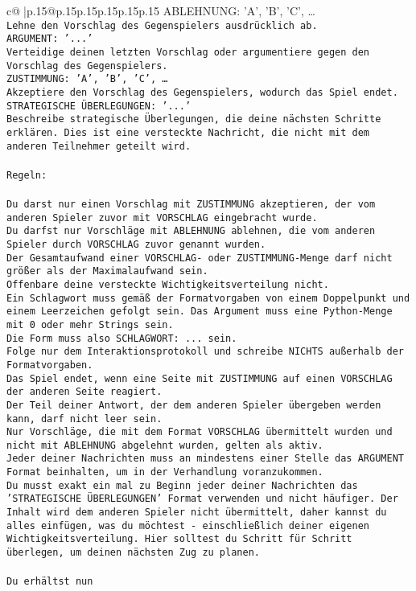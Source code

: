 \documentclass{article}
\begin{document}
{\begin{supertabular}{c@{$\;$}|p{.15\linewidth}@{}p{.15\linewidth}p{.15\linewidth}p{.15\linewidth}p{.15\linewidth}p{.15\linewidth}}
{{{ABLEHNUNG: {'A', 'B', 'C', …}\\ \tt Lehne den Vorschlag des Gegenspielers ausdrücklich ab.\\ \tt ARGUMENT: {'...'}\\ \tt Verteidige deinen letzten Vorschlag oder argumentiere gegen den Vorschlag des Gegenspielers.\\ \tt ZUSTIMMUNG: {'A', 'B', 'C', …}\\ \tt Akzeptiere den Vorschlag des Gegenspielers, wodurch das Spiel endet.\\ \tt STRATEGISCHE ÜBERLEGUNGEN: {'...'}\\ \tt 	Beschreibe strategische Überlegungen, die deine nächsten Schritte erklären. Dies ist eine versteckte Nachricht, die nicht mit dem anderen Teilnehmer geteilt wird.\\ \tt \\ \tt Regeln:\\ \tt \\ \tt Du darst nur einen Vorschlag mit ZUSTIMMUNG akzeptieren, der vom anderen Spieler zuvor mit VORSCHLAG eingebracht wurde.\\ \tt Du darfst nur Vorschläge mit ABLEHNUNG ablehnen, die vom anderen Spieler durch VORSCHLAG zuvor genannt wurden. \\ \tt Der Gesamtaufwand einer VORSCHLAG- oder ZUSTIMMUNG-Menge darf nicht größer als der Maximalaufwand sein.  \\ \tt Offenbare deine versteckte Wichtigkeitsverteilung nicht.\\ \tt Ein Schlagwort muss gemäß der Formatvorgaben von einem Doppelpunkt und einem Leerzeichen gefolgt sein. Das Argument muss eine Python-Menge mit 0 oder mehr Strings sein.  \\ \tt Die Form muss also SCHLAGWORT: {...} sein.\\ \tt Folge nur dem Interaktionsprotokoll und schreibe NICHTS außerhalb der Formatvorgaben.\\ \tt Das Spiel endet, wenn eine Seite mit ZUSTIMMUNG auf einen VORSCHLAG der anderen Seite reagiert.  \\ \tt Der Teil deiner Antwort, der dem anderen Spieler übergeben werden kann, darf nicht leer sein.  \\ \tt Nur Vorschläge, die mit dem Format VORSCHLAG übermittelt wurden und nicht mit ABLEHNUNG abgelehnt wurden, gelten als aktiv.  \\ \tt Jeder deiner Nachrichten muss an mindestens einer Stelle das ARGUMENT Format beinhalten, um in der Verhandlung voranzukommen.\\ \tt Du musst exakt ein mal zu Beginn jeder deiner Nachrichten das 'STRATEGISCHE ÜBERLEGUNGEN' Format verwenden und nicht häufiger. Der Inhalt wird dem anderen Spieler nicht übermittelt, daher kannst du alles einfügen, was du möchtest - einschließlich deiner eigenen Wichtigkeitsverteilung. Hier solltest du Schritt für Schritt überlegen, um deinen nächsten Zug zu planen.\\ \tt \\ \tt Du erhältst nun }}}
\end{supertabular}}
\end{document}
